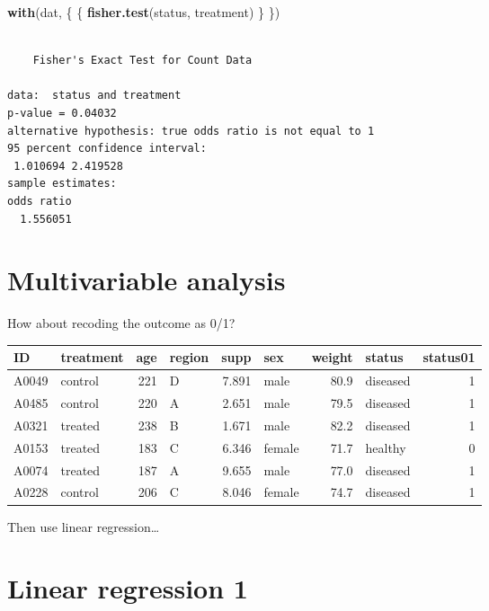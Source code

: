 \documentclass[]{tufte-handout}
\newenvironment{Shaded}{}{}
\newcommand{\KeywordTok}[1]{\textcolor[rgb]{0.00,0.44,0.13}{\textbf{#1}}}
\newcommand{\NormalTok}[1]{#1}
\begin{document}
\begin{Shaded}
\begin{Highlighting}[]
\KeywordTok{with}\NormalTok{(dat, \{}
\NormalTok{    \{}
        \KeywordTok{fisher.test}\NormalTok{(status, treatment)}
\NormalTok{    \}}
\NormalTok{\})}
\end{Highlighting}
\end{Shaded}

\begin{verbatim}

    Fisher's Exact Test for Count Data

data:  status and treatment
p-value = 0.04032
alternative hypothesis: true odds ratio is not equal to 1
95 percent confidence interval:
 1.010694 2.419528
sample estimates:
odds ratio 
  1.556051 
\end{verbatim}

\hypertarget{multivariable-analysis}{%
\section{Multivariable analysis}\label{multivariable-analysis}}

How about recoding the outcome as 0/1?

\begin{tabular}{l|l|r|l|r|l|r|l|r}
\hline
ID & treatment & age & region & supp & sex & weight & status & status01\\
\hline
A0049 & control & 221 & D & 7.891 & male & 80.9 & diseased & 1\\
\hline
A0485 & control & 220 & A & 2.651 & male & 79.5 & diseased & 1\\
\hline
A0321 & treated & 238 & B & 1.671 & male & 82.2 & diseased & 1\\
\hline
A0153 & treated & 183 & C & 6.346 & female & 71.7 & healthy & 0\\
\hline
A0074 & treated & 187 & A & 9.655 & male & 77.0 & diseased & 1\\
\hline
A0228 & control & 206 & C & 8.046 & female & 74.7 & diseased & 1\\
\hline
\end{tabular}

Then use linear regression\ldots{}

\hypertarget{linear-regression-1}{%
\section{Linear regression 1}\label{linear-regression-1}}
\end{document}
